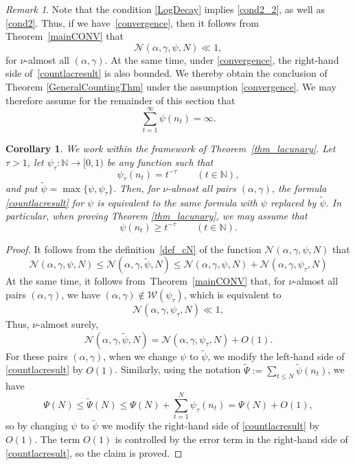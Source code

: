 \documentclass[12pt, reqno]{amsart}
\newtheorem{cor}[thm]{Corollary}
\theoremstyle{definition}
\theoremstyle{remark}
\newtheorem{remark}[thm]{Remark}
\numberwithin{equation}{section}
\def\alp{{\alpha}} \def\bfalp{{\boldsymbol \alpha}}
\def\gam{{\gamma}} \def\Gam{{\Gamma}}
\def\le{\leqslant} \def\ge{\geqslant}
\def\leq{\leqslant}
\def\geq{\geqslant}
\def \bN {\mathbb N}
\def \cN {\mathcal N}
\def \cW {\mathcal W}
\begin{document}
\begin{remark}
Note that the condition \eqref{LogDecay} implies \eqref{cond2_2}, as well as \eqref{cond2}. Thus, if we have~\eqref{convergence}, then it follows from Theorem~\ref{mainCONV} that
\[
\cN(\alp,\gam,\psi,N) \ll 1,
\]
for $\nu$-almost all  $(\alpha,\gamma)$. At the same time, under 
\eqref{convergence},
the right-hand side of~\eqref{countlacresult} is also bounded. We thereby obtain the conclusion of Theorem
\ref{GeneralCountingThm} under the assumption \eqref{convergence}.
We may therefore assume for the remainder of this section that
\begin{equation*} \label{divergence}
\sum_{t=1}^\infty \psi(n_t) = \infty.
\end{equation*}
\end{remark}

\begin{cor} \label{cor_min_psi}
We work within the framework of Theorem~\ref{thm_lacunary}. Let $\tau>1$, let $\psi_\tau: \bN \to [0,1)$ be any function such that
\[
\psi_\tau(n_t) = t^{-\tau}
\qquad (t \in \bN),
\]
and put
$\widetilde{\psi} = 
\max \{ \psi, \psi_\tau \}$.
Then, for $\nu$-almost all pairs $(\alp, \gam)$, the formula \eqref{countlacresult} for $\psi$ is equivalent to the same formula with $\psi$ replaced by $\widetilde{\psi}$. In particular, when proving Theorem \ref{thm_lacunary}, we may assume that
\begin{equation*}
\label{psi_is_not_small}
\psi(n_t) \geq t^{-\tau}
\qquad (t \in \bN).
\end{equation*}
\end{cor}

\begin{proof}
It follows from the definition~\eqref{def_cN} of the function $\cN(\alp,\gam,\psi,N)$ that
\[
\cN(\alp,\gam,\psi,N)\leq \cN(\alp,\gam,\widetilde{\psi},N)\leq \cN(\alp,\gam,\psi,N)+\cN(\alp,\gam,\psi_{\tau},N)
\]
At the same time, it follows from~Theorem~\ref{mainCONV} that, for $\nu$-almost all pairs $(\alp,\gam)$, we have $(\alp, \gam) \notin \cW(\psi_{\tau})$, which is equivalent to
\[
\cN(\alp,\gam,\psi_{\tau},N)
\ll 1,
\]
Thus, $\nu$-almost surely,
\[
\cN(\alp,\gam,\widetilde{\psi},N)=\cN(\alp,\gam,\psi_{\tau},N) + O(1).
\]
For these pairs $(\alpha, \gam)$, when we change $\psi$ to $\widetilde{\psi}$, we modify the left-hand side of \eqref{countlacresult} by $O(1)$.
Similarly, using the notation $\widetilde{\Psi}:=\sum_{t \le N} \widetilde{\psi}(n_t)$, we have
\[
\Psi(N)\leq\widetilde{\Psi}(N)\leq\Psi(N)+\sum_{t=1}^N\psi_{\tau}(n_t)=\Psi(N)+O(1),
\]
so by changing $\psi$ to $\widetilde{\psi}$ we modify the right-hand side of \eqref{countlacresult} by $O(1)$.
The term $O(1)$ is controlled by the error term in the right-hand side of \eqref{countlacresult}, so the claim is proved.
\end{proof}
\end{document}
